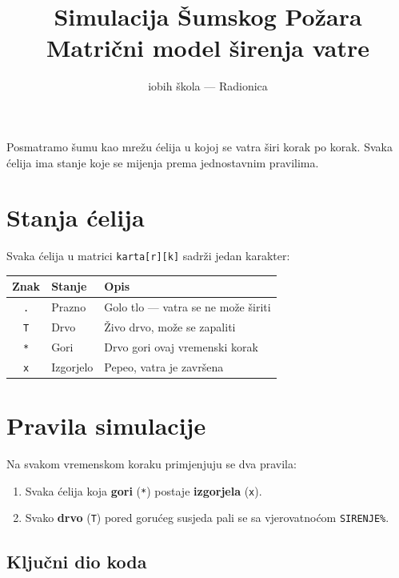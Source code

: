 \documentclass[11pt]{article}
\title{\textbf{\color{accent}Simulacija Šumskog Požara}\\[4pt]
       \large Matrični model širenja vatre}
\author{iobih škola — Radionica}
\date{}
\begin{document}
\maketitle
\thispagestyle{fancy}

Posmatramo šumu kao mrežu ćelija u kojoj se vatra širi korak po korak.
Svaka ćelija ima stanje koje se mijenja prema jednostavnim pravilima.

\section{Stanja ćelija}

Svaka ćelija u matrici \texttt{karta[r][k]} sadrži jedan karakter:

\begin{center}
\begin{tabular}{@{} c l l @{}}
    \toprule
    \textbf{Znak} & \textbf{Stanje} & \textbf{Opis} \\
    \midrule
    \texttt{.} & Prazno     & Golo tlo — vatra se ne može širiti \\
    \texttt{T} & Drvo       & Živo drvo, može se zapaliti \\
    \texttt{*} & Gori       & Drvo gori ovaj vremenski korak \\
    \texttt{x} & Izgorjelo  & Pepeo, vatra je završena \\
    \bottomrule
\end{tabular}
\end{center}

\section{Pravila simulacije}

Na svakom vremenskom koraku primjenjuju se dva pravila:

\begin{enumerate}
    \item Svaka ćelija koja \textbf{gori} (\texttt{*}) postaje \textbf{izgorjela} (\texttt{x}).
    \item Svako \textbf{drvo} (\texttt{T}) pored gorućeg susjeda pali se
          sa vjerovatnoćom \texttt{SIRENJE\%}.
\end{enumerate}

\subsection{Ključni dio koda}
\end{document}
